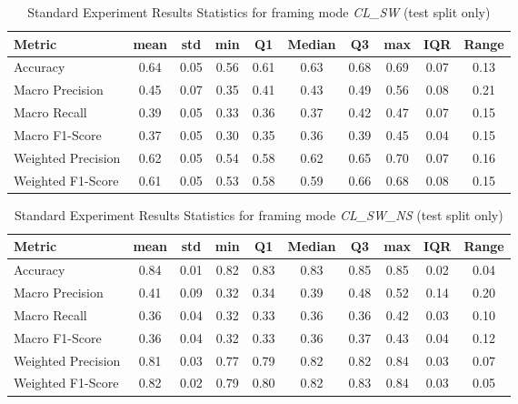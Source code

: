 \begin{table}[h]
\caption{Standard Experiment Results Statistics for framing mode \textit{CL\_SW} (test split only)}
\label{tab:cl_sw_Standard_Results_Statistics_test}
\begin{tabular}{|l|c|c|c|c|c|c|c|c|c|}
\toprule
Metric & mean & std & min & Q1 & Median & Q3 & max & IQR & Range \\
\midrule
Accuracy & 0.64 & 0.05 & 0.56 & 0.61 & 0.63 & 0.68 & 0.69 & 0.07 & 0.13 \\
Macro Precision & 0.45 & 0.07 & 0.35 & 0.41 & 0.43 & 0.49 & 0.56 & 0.08 & 0.21 \\
Macro Recall & 0.39 & 0.05 & 0.33 & 0.36 & 0.37 & 0.42 & 0.47 & 0.07 & 0.15 \\
Macro F1-Score & 0.37 & 0.05 & 0.30 & 0.35 & 0.36 & 0.39 & 0.45 & 0.04 & 0.15 \\
Weighted Precision & 0.62 & 0.05 & 0.54 & 0.58 & 0.62 & 0.65 & 0.70 & 0.07 & 0.16 \\
Weighted F1-Score & 0.61 & 0.05 & 0.53 & 0.58 & 0.59 & 0.66 & 0.68 & 0.08 & 0.15 \\
\bottomrule
\end{tabular}
\end{table}

\begin{table}[h]
\caption{Standard Experiment Results Statistics for framing mode \textit{CL\_SW\_NS} (test split only)}
\label{tab:cl_sw_ns_Standard_Results_Statistics_test}
\begin{tabular}{|l|c|c|c|c|c|c|c|c|c|}
\toprule
Metric & mean & std & min & Q1 & Median & Q3 & max & IQR & Range \\
\midrule
Accuracy & 0.84 & 0.01 & 0.82 & 0.83 & 0.83 & 0.85 & 0.85 & 0.02 & 0.04 \\
Macro Precision & 0.41 & 0.09 & 0.32 & 0.34 & 0.39 & 0.48 & 0.52 & 0.14 & 0.20 \\
Macro Recall & 0.36 & 0.04 & 0.32 & 0.33 & 0.36 & 0.36 & 0.42 & 0.03 & 0.10 \\
Macro F1-Score & 0.36 & 0.04 & 0.32 & 0.33 & 0.36 & 0.37 & 0.43 & 0.04 & 0.12 \\
Weighted Precision & 0.81 & 0.03 & 0.77 & 0.79 & 0.82 & 0.82 & 0.84 & 0.03 & 0.07 \\
Weighted F1-Score & 0.82 & 0.02 & 0.79 & 0.80 & 0.82 & 0.83 & 0.84 & 0.03 & 0.05 \\
\bottomrule
\end{tabular}
\end{table}